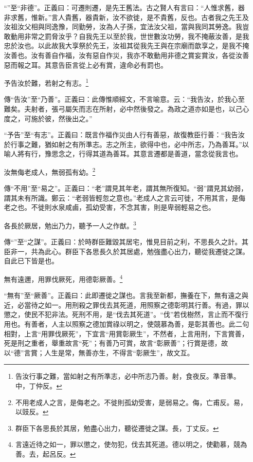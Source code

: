 {\noindent\shu{}\fzkt “”至“非德”。正義曰：可遷則遷，是先王舊法。古之賢人有言曰：“人惟求舊，器非求舊，惟新。”言人貴舊，器貴新，汝不欲徙，是不貴舊，反也。古者我之先王及汝祖汝父相與同逸豫，同勤勞，汝為人子孫，宜法汝父祖，當與我同其勞逸。我豈敢動用非常之罰脅汝乎？自我先王以至於我，世世數汝功勞，我不掩蔽汝善，是我忠於汝也。以此故我大享祭於先王，汝祖其從我先王與在宗廟而歆享之，是我不掩汝善也。汝有善自作福，汝有惡自作災，我亦不敢動用非德之賞妄賞汝，各從汝善惡而報之耳。其意告臣言從上必有賞，違命必有罰也。 \par}

予告汝於難，若射之有志。\footnote{告汝行事之難，當如射之有所準志，必中所志乃善。射，食夜反。準音準。中，丁仲反。}

{\noindent\zhuan{}\fzbyks 傳“告汝”至“乃善”。正義曰：此傳惟順經文，不言喻意。云：“我告汝，於我心至難矣。夫射者，張弓屬矢而志在所射，必中然後發之。為政之道亦如是也，以己心度之，可施於彼，然後出之。” \par}

{\noindent\shu{}\fzkt “予告”至“有志”。正義曰：既言作福作災由人行有善惡，故復教臣行善：“我告汝於行事之難，猶如射之有所準志。志之所主，欲得中也，必中所志，乃為善耳。”以喻人將有行，豫思念之，行得其道為善耳。其意言遷都是善道，當念從我言也。 \par}

汝無侮老成人，無弱孤有幼。\footnote{不用老成人之言，是侮老之。不徙則孤幼受害，是弱易之。侮，亡甫反。易，以豉反。}

{\noindent\zhuan{}\fzbyks 傳“不用”至“易之”。正義曰：“老”謂見其年老，謂其無所復知。“弱”謂見其幼弱，謂其未有所識。鄭云：“老弱皆輕忽之意也。”老成人之言云可徙，不用其言，是侮老之也。不徙則水泉咸鹵，孤幼受害，不念其害，則是卑弱輕易之也。 \par}

各長於厥居，勉出乃力，聽予一人之作猷。\footnote{群臣下各思長於其居，勉盡心出力，聽從遷徙之謀。長，丁丈反。}

{\noindent\zhuan{}\fzbyks 傳“”至“之謀”。正義曰：於時群臣難毀其居宅，惟見目前之利，不思長久之計。其臣非一，共為此心。群臣下各思長久於其居處，勉強盡心出力，聽從我遷徙之謀。自此已下皆是也。 \par}

無有遠邇，用罪伐厥死，用德彰厥善。\footnote{言遠近待之如一，罪以懲之，使勿犯，伐去其死道。德以明之，使勸慕，競為善。去，起呂反。}

{\noindent\shu{}\fzkt “無有”至“厥善”。正義曰：此即遷徙之謀也。言我至新都，撫養在下，無有遠之與近，必當待之如一。用刑殺之罪伐去其死道，用照察之德彰明其行善。有過，罪以懲之，使民不犯非法。死刑不用，是“伐去其死道”。“伐”若伐樹然，言止而不復行用也。有善者，人主以照察之德加賞祿以明之，使競慕為善，是彰其善也。此二句相對，上言“用罪伐厥死”，下宜言“用賞彰厥生”，不然者，上言用刑，下言賞善，死是刑之重者，舉重故言“死”；有善乃可賞，故言“彰厥善”；行賞是德，故以“德”言賞；人生是常，無善亦生，不得言“彰厥生”，故文互。 \par}


